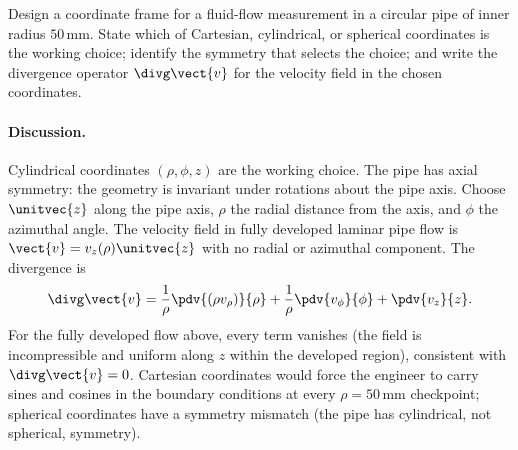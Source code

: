 \begin{exercise}
Design a coordinate frame for a fluid-flow measurement in a
circular pipe of inner radius $50 \,\si{\milli\meter}$. State which
of Cartesian, cylindrical, or spherical coordinates is the working
choice; identify the symmetry that selects the choice; and write
the divergence operator $\divg\vect{v}$ for the velocity field in
the chosen coordinates.

\paragraph{Discussion.} Cylindrical coordinates $(\rho, \phi, z)$
are the working choice. The pipe has axial symmetry: the geometry is
invariant under rotations about the pipe axis. Choose $\unitvec{z}$
along the pipe axis, $\rho$ the radial distance from the axis, and
$\phi$ the azimuthal angle. The velocity field in fully developed
laminar pipe flow is $\vect{v} = v_{z}(\rho)\unitvec{z}$ with no
radial or azimuthal component. The divergence is
\[
\divg\vect{v} = \frac{1}{\rho}\pdv{(\rho v_{\rho})}{\rho} +
\frac{1}{\rho}\pdv{v_{\phi}}{\phi} + \pdv{v_{z}}{z}.
\]
For the fully developed flow above, every term vanishes (the field
is incompressible and uniform along $z$ within the developed
region), consistent with $\divg\vect{v} = 0$. Cartesian coordinates
would force the engineer to carry sines and cosines in the
boundary conditions at every $\rho = 50\,\si{\milli\meter}$
checkpoint; spherical coordinates have a symmetry mismatch (the
pipe has cylindrical, not spherical, symmetry).
\end{exercise}

